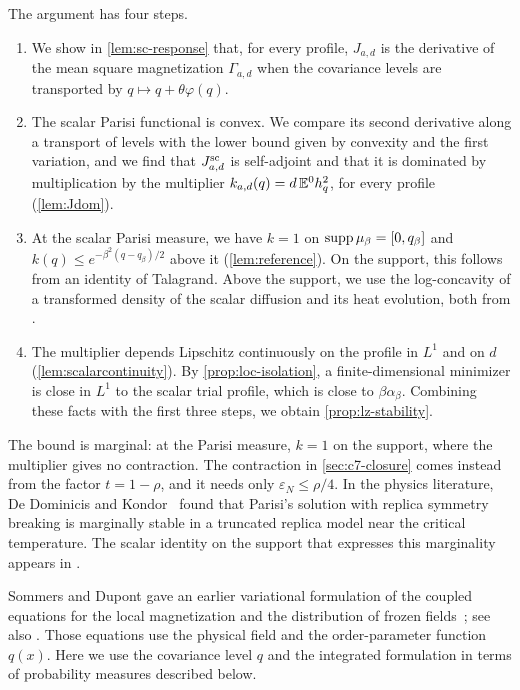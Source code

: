 The argument has four steps.
\begin{enumerate}
\item We show in \cref{lem:sc-response} that, for every profile,
 $J_{a,d}$ is the derivative of the mean square magnetization
 $\Gamma_{a,d}$ when the covariance levels are transported by
 $q\mapsto q+\theta\varphi(q)$.
\item The scalar Parisi functional is convex. We compare its second
 derivative along a transport of levels with the lower bound given by
 convexity and the first variation, and we find that $J^{\mathrm{sc}}_{a,d}$
 is self-adjoint and that it is dominated by multiplication by the
 multiplier $k_{a,d}(q)=d\,\mathbb E^0h_q^2$, for every profile
 (\cref{lem:Jdom}).
\item At the scalar Parisi measure, we have $k=1$ on
 $\operatorname{supp}\mu_\beta=[0,q_\beta]$ and $k(q)\le e^{-\beta^2(q-q_\beta)/2}$
 above it (\cref{lem:reference}). On the support, this follows from an
 identity of Talagrand. Above the support, we use the log-concavity of
 a transformed density of the scalar diffusion and its heat evolution,
 both from \cite{Lopatto}.
\item The multiplier depends Lipschitz continuously on the profile in
 $L^1$ and on $d$ (\cref{lem:scalarcontinuity}). By
 \cref{prop:loc-isolation}, a finite-dimensional minimizer is close in
 $L^1$ to the scalar trial profile, which is close to
 $\beta\alpha_\beta$. Combining these facts with the first three steps,
 we obtain \cref{prop:lz-stability}.
\end{enumerate}
The bound is marginal: at the Parisi measure, $k=1$ on the support,
where the multiplier gives no contraction. The contraction in
\cref{sec:c7-closure} comes instead from the factor $t=1-\rho$, and it
needs only $\varepsilon_N\le\rho/4$. In the physics literature, De
Dominicis and Kondor~\cite[pp.~606--608]{DeDominicisKondor1983} found
that Parisi's solution with replica symmetry breaking is marginally stable
in a truncated replica model near the critical temperature. The
scalar identity on the support that
expresses this marginality appears in
\cite[Eqs.~(22)--(23)]{CrisantiRizzo2002}.

Sommers and Dupont gave an earlier variational formulation of the
coupled equations for the local magnetization and the distribution
of frozen fields~\cite[Section~2, Eqs.~(1)--(7), and
Eq.~(33)]{SommersDupont1984}; see also
\cite[Section~III, (14)--(18), (22)--(23)]{CrisantiRizzo2002}.
Those equations use the physical field and the order-parameter function
$q(x)$. Here we use the covariance level $q$ and the integrated
formulation in terms of probability measures described below.


